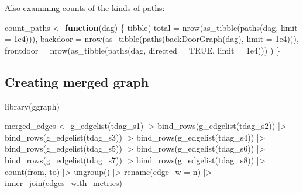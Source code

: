 \documentclass[
  letterpaper,
  DIV=11,
  numbers=noendperiod]{scrartcl}
\newenvironment{Shaded}{\begin{snugshade}}{\end{snugshade}}
\newcommand{\AttributeTok}[1]{\textcolor[rgb]{0.40,0.45,0.13}{#1}}
\newcommand{\ConstantTok}[1]{\textcolor[rgb]{0.56,0.35,0.01}{#1}}
\newcommand{\ControlFlowTok}[1]{\textcolor[rgb]{0.00,0.23,0.31}{\textbf{#1}}}
\newcommand{\FloatTok}[1]{\textcolor[rgb]{0.68,0.00,0.00}{#1}}
\newcommand{\FunctionTok}[1]{\textcolor[rgb]{0.28,0.35,0.67}{#1}}
\newcommand{\NormalTok}[1]{\textcolor[rgb]{0.00,0.23,0.31}{#1}}
\newcommand{\OtherTok}[1]{\textcolor[rgb]{0.00,0.23,0.31}{#1}}
\newcommand{\SpecialCharTok}[1]{\textcolor[rgb]{0.37,0.37,0.37}{#1}}
\begin{document}
Also examining counts of the kinds of paths:

\begin{Shaded}
\begin{Highlighting}[]
\NormalTok{count\_paths }\OtherTok{\textless{}{-}} \ControlFlowTok{function}\NormalTok{(dag) \{}
  \FunctionTok{tibble}\NormalTok{(}
    \AttributeTok{total     =} \FunctionTok{nrow}\NormalTok{(}\FunctionTok{as\_tibble}\NormalTok{(}\FunctionTok{paths}\NormalTok{(dag, }\AttributeTok{limit =} \FloatTok{1e4}\NormalTok{))),}
    \AttributeTok{backdoor  =} \FunctionTok{nrow}\NormalTok{(}\FunctionTok{as\_tibble}\NormalTok{(}\FunctionTok{paths}\NormalTok{(}\FunctionTok{backDoorGraph}\NormalTok{(dag), }\AttributeTok{limit =} \FloatTok{1e4}\NormalTok{))),}
    \AttributeTok{frontdoor =} \FunctionTok{nrow}\NormalTok{(}\FunctionTok{as\_tibble}\NormalTok{(}\FunctionTok{paths}\NormalTok{(dag, }\AttributeTok{directed =} \ConstantTok{TRUE}\NormalTok{, }\AttributeTok{limit =} \FloatTok{1e4}\NormalTok{)))}
\NormalTok{  )}
\NormalTok{\}}
\end{Highlighting}
\end{Shaded}

\subsection{Creating merged graph}\label{creating-merged-graph}

\begin{Shaded}
\begin{Highlighting}[]
\FunctionTok{library}\NormalTok{(ggraph)}

\NormalTok{merged\_edges }\OtherTok{\textless{}{-}} \FunctionTok{g\_edgelist}\NormalTok{(tdag\_s1) }\SpecialCharTok{|\textgreater{}} 
    \FunctionTok{bind\_rows}\NormalTok{(}\FunctionTok{g\_edgelist}\NormalTok{(tdag\_s2)) }\SpecialCharTok{|\textgreater{}} 
    \FunctionTok{bind\_rows}\NormalTok{(}\FunctionTok{g\_edgelist}\NormalTok{(tdag\_s3)) }\SpecialCharTok{|\textgreater{}} 
    \FunctionTok{bind\_rows}\NormalTok{(}\FunctionTok{g\_edgelist}\NormalTok{(tdag\_s4)) }\SpecialCharTok{|\textgreater{}} 
    \FunctionTok{bind\_rows}\NormalTok{(}\FunctionTok{g\_edgelist}\NormalTok{(tdag\_s5)) }\SpecialCharTok{|\textgreater{}} 
    \FunctionTok{bind\_rows}\NormalTok{(}\FunctionTok{g\_edgelist}\NormalTok{(tdag\_s6)) }\SpecialCharTok{|\textgreater{}} 
    \FunctionTok{bind\_rows}\NormalTok{(}\FunctionTok{g\_edgelist}\NormalTok{(tdag\_s7)) }\SpecialCharTok{|\textgreater{}} 
    \FunctionTok{bind\_rows}\NormalTok{(}\FunctionTok{g\_edgelist}\NormalTok{(tdag\_s8)) }\SpecialCharTok{|\textgreater{}} 
    \FunctionTok{count}\NormalTok{(from, to) }\SpecialCharTok{|\textgreater{}} \FunctionTok{ungroup}\NormalTok{() }\SpecialCharTok{|\textgreater{}} \FunctionTok{rename}\NormalTok{(}\AttributeTok{edge\_w =}\NormalTok{ n) }\SpecialCharTok{|\textgreater{}} 
    \FunctionTok{inner\_join}\NormalTok{(edges\_with\_metrics)}
\end{Highlighting}
\end{Shaded}
\end{document}
